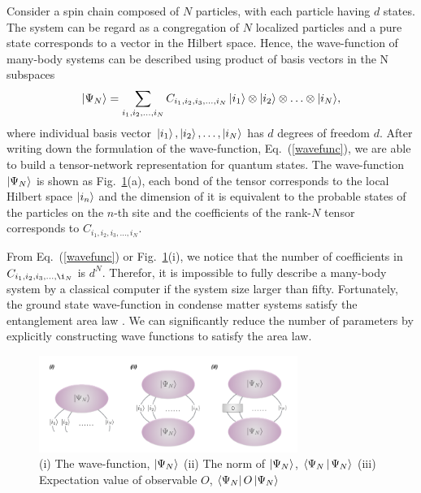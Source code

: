 Consider a spin chain composed of $N$ particles, with each particle having $d$ states. The system can be regard as a congregation of $N$ localized particles and a pure state corresponds to a vector in the Hilbert space. Hence, the wave-function of many-body systems can be described using product of basis vectors in the N subspaces
\begin{align}
	\Ket{\Psi_{N}} =\sum_{i_1,i_2,\ldots,i_N}{C_{i_1,i_2,i_3,\ldots,i_N}\Ket{i_1}\otimes\Ket{i_2}\otimes \ldots \otimes \Ket{i_N}},
	\label{wavefunc}
\end{align}
where individual basis vector $\Ket{i_1}, \Ket{i_2},\ldots, \Ket{i_N}$ has $d$ degrees of freedom $d$. After writing down the formulation of the wave-function, Eq.~(\ref{wavefunc}), we are able to build a tensor-network representation for quantum states. The wave-function $\Ket{\Psi_N}$ is shown as Fig.~\ref{fig225}(a), each bond of the tensor corresponds to the local Hilbert space $\Ket{i_n}$ and the dimension of it is equivalent to the probable states of the particles on the $n$-th site and the coefficients of the rank-$N$ tensor corresponds to $C_{i_1,i_2,i_3,\ldots,i_N}$.

From Eq.~(\ref{wavefunc}) or Fig.~\ref{fig225}(i), we notice that the number of coefficients in $C_{i_1,i_2,i_3,\ldots,\i_N}$ is $d^N$. Therefor, it is impossible to fully describe a many-body system by a classical computer if the system size larger than fifty. Fortunately, the ground state wave-function in condense matter systems satisfy the entanglement area law \cite{RevModPhys.82.277}. We can significantly reduce the number of parameters by explicitly constructing wave functions to satisfy the area law.
\begin{figure}[ht]
	\centering
	\includegraphics[width=0.75\textwidth]{figures/fig225.png}
	\caption[Represent wave-function of quntum states of TN]{(i) The wave-function, $\Ket{\Psi_N}$ (ii) The norm of $\Ket{\Psi_N}$, $\Braket{\Psi_N|\Psi_N}$ (iii) Expectation value of observable $O$, $\Bra{\Psi_N}O\Ket{\Psi_N}$}
	\label{fig225}
\end{figure}

